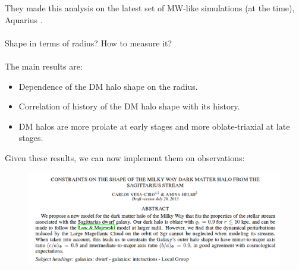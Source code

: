 \documentclass[xcolor=dvipsnames]{beamer}
\begin{document}
\begin{frame}
\begin{columns}[c]
\begin{column}{.7\textwidth}
\end{column}

\end{columns}

\end{frame}

\begin{frame}

They made this analysis on the latest set of MW-like simulations (at the time), Aquarius \cite{aquarius}.\\~\\

Shape in terms of radius? How to measure it? \\~\\

The main results are: 

\begin{itemize}
\item Dependence of the DM halo shape on the radius.

\item Correlation of history of the DM halo shape with its history.

\item DM halos are more prolate at early stages and more oblate-triaxial at late stages.

\end{itemize}

\end{frame}


\begin{frame}

Given these results, we can now implement them on observations:

\begin{figure}[c]
\includegraphics[width=1\linewidth]{./pics/veraCiroSagitarius.png}
\end{figure}

\end{frame}
\end{document}
